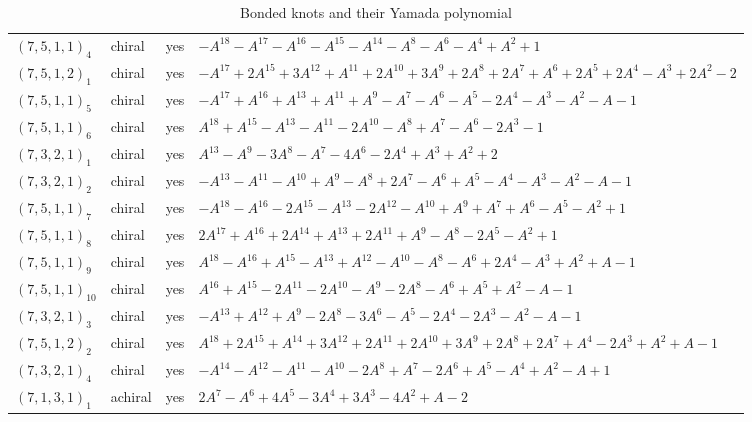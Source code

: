 \begin{table}[h]
\begin{tabular}{lll}
$(7,5,1,1)_{4}$ & chiral & yes & $-A^{18} - A^{17} - A^{16} - A^{15} - A^{14} - A^{8} - A^{6} - A^{4} + A^{2} + 1$ \\
$(7,5,1,2)_{1}$ & chiral & yes & $-A^{17} + 2A^{15} + 3A^{12} + A^{11} + 2A^{10} + 3A^{9} + 2A^{8} + 2A^{7} + A^{6} + 2A^{5} + 2A^{4} - A^{3} + 2A^{2} - 2$ \\
$(7,5,1,1)_{5}$ & chiral & yes & $-A^{17} + A^{16} + A^{13} + A^{11} + A^{9} - A^{7} - A^{6} - A^{5} - 2A^{4} - A^{3} - A^{2} - A - 1$ \\
$(7,5,1,1)_{6}$ & chiral & yes & $A^{18} + A^{15} - A^{13} - A^{11} - 2A^{10} - A^{8} + A^{7} - A^{6} - 2A^{3} - 1$ \\
$(7,3,2,1)_{1}$ & chiral & yes & $A^{13} - A^{9} - 3A^{8} - A^{7} - 4A^{6} - 2A^{4} + A^{3} + A^{2} + 2$ \\
$(7,3,2,1)_{2}$ & chiral & yes & $-A^{13} - A^{11} - A^{10} + A^{9} - A^{8} + 2A^{7} - A^{6} + A^{5} - A^{4} - A^{3} - A^{2} - A - 1$ \\
$(7,5,1,1)_{7}$ & chiral & yes & $-A^{18} - A^{16} - 2A^{15} - A^{13} - 2A^{12} - A^{10} + A^{9} + A^{7} + A^{6} - A^{5} - A^{2} + 1$ \\
$(7,5,1,1)_{8}$ & chiral & yes & $2A^{17} + A^{16} + 2A^{14} + A^{13} + 2A^{11} + A^{9} - A^{8} - 2A^{5} - A^{2} + 1$ \\
$(7,5,1,1)_{9}$ & chiral & yes & $A^{18} - A^{16} + A^{15} - A^{13} + A^{12} - A^{10} - A^{8} - A^{6} + 2A^{4} - A^{3} + A^{2} + A - 1$ \\
$(7,5,1,1)_{10}$ & chiral & yes & $A^{16} + A^{15} - 2A^{11} - 2A^{10} - A^{9} - 2A^{8} - A^{6} + A^{5} + A^{2} - A - 1$ \\
$(7,3,2,1)_{3}$ & chiral & yes & $-A^{13} + A^{12} + A^{9} - 2A^{8} - 3A^{6} - A^{5} - 2A^{4} - 2A^{3} - A^{2} - A - 1$ \\
$(7,5,1,2)_{2}$ & chiral & yes & $A^{18} + 2A^{15} + A^{14} + 3A^{12} + 2A^{11} + 2A^{10} + 3A^{9} + 2A^{8} + 2A^{7} + A^{4} - 2A^{3} + A^{2} + A - 1$ \\
$(7,3,2,1)_{4}$ & chiral & yes & $-A^{14} - A^{12} - A^{11} - A^{10} - 2A^{8} + A^{7} - 2A^{6} + A^{5} - A^{4} + A^{2} - A + 1$ \\
$(7,1,3,1)_{1}$ & achiral & yes & $2A^{7} - A^{6} + 4A^{5} - 3A^{4} + 3A^{3} - 4A^{2} + A - 2$ \\
\hline
\end{tabular}
\caption{Bonded knots and their Yamada polynomial}
\end{table}

